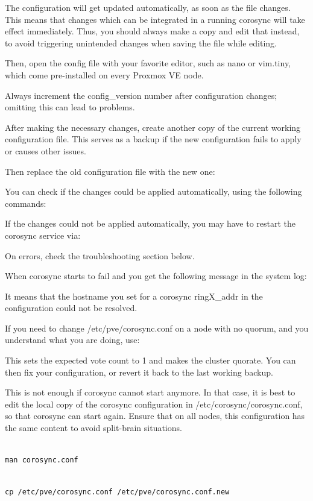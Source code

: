 The configuration will get updated automatically, as soon as the file changes. This means that changes which can be integrated in a running corosync will take effect immediately. Thus, you should always make a copy and edit that instead, to avoid triggering unintended changes when saving the file while editing.

Then, open the config file with your favorite editor, such as nano or vim.tiny, which come pre-installed on every Proxmox VE node.

Always increment the config_version number after configuration changes; omitting this can lead to problems.

After making the necessary changes, create another copy of the current working configuration file. This serves as a backup if the new configuration fails to apply or causes other issues.

Then replace the old configuration file with the new one:

You can check if the changes could be applied automatically, using the following commands:

If the changes could not be applied automatically, you may have to restart the corosync service via:

On errors, check the troubleshooting section below.

When corosync starts to fail and you get the following message in the system log:

It means that the hostname you set for a corosync ringX_addr in the configuration could not be resolved.

If you need to change /etc/pve/corosync.conf on a node with no quorum, and you understand what you are doing, use:

This sets the expected vote count to 1 and makes the cluster quorate. You can then fix your configuration, or revert it back to the last working backup.

This is not enough if corosync cannot start anymore. In that case, it is best to edit the local copy of the corosync configuration in /etc/corosync/corosync.conf, so that corosync can start again. Ensure that on all nodes, this configuration has the same content to avoid split-brain situations.

\begin{lstlisting}

man corosync.conf

\end{lstlisting}

\begin{lstlisting}

cp /etc/pve/corosync.conf /etc/pve/corosync.conf.new

\end{lstlisting}

